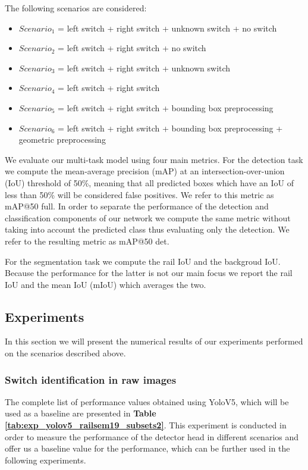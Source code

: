 \documentclass[conference]{IEEEtran}
\begin{document}
The following scenarios are considered:
\begin{itemize}
    \item $Scenario_1$ = left switch + right switch + unknown switch + no switch
    \item $Scenario_2$ = left switch + right switch + no switch
    \item $Scenario_3$ = left switch + right switch + unknown switch
    \item $Scenario_4$ = left switch + right switch 
    \item $Scenario_5$ = left switch + right switch + bounding box preprocessing
    \item $Scenario_6$ = left switch + right switch + bounding box preprocessing + geometric preprocessing
    
\end{itemize}

We evaluate our multi-task model using four main metrics. For the detection task we compute the mean-average precision (mAP) at an intersection-over-union (IoU) threshold of 50\%, meaning that all predicted boxes which have an IoU of less than 50\% will be considered false positives. We refer to this metric as mAP@50 full. In order to separate the performance of the detection and classification components of our network we compute the same metric without taking into account the predicted class thus evaluating only the detection. We refer to the resulting metric as mAP@50 det. 

For the segmentation task we compute the rail IoU and the backgroud IoU. Because the performance for the latter is not our main focus we report the rail IoU and the mean IoU (mIoU) which averages the two.

\subsection{Experiments}

In this section we will present the numerical results of our experiments performed on the scenarios described above.

\subsubsection{Switch identification in raw images}

The complete list of performance values obtained using YoloV5, which will be used as a baseline are presented in \textbf{Table \ref{tab:exp_yolov5_railsem19_subsets2}}. This experiment is conducted in order to measure the performance
of the detector head
in different scenarios 
and offer us a baseline value for the performance, which can be further used in the following experiments.
\end{document}
